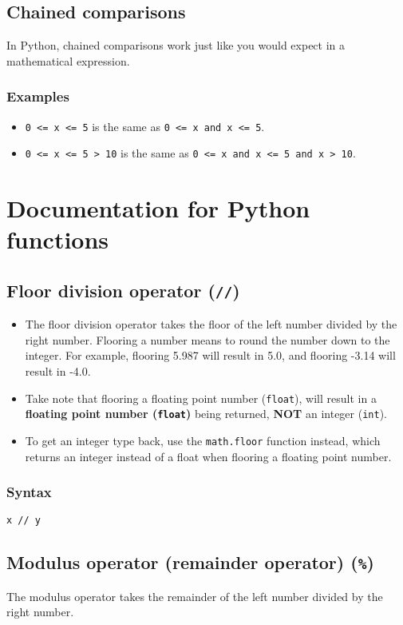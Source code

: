 \documentclass[11pt]{article}
\begin{document}
 \newpage
\subsection{Chained comparisons}
\label{sec:org6e1f575}
In Python, chained comparisons work just like you would expect in a mathematical expression.
\subsubsection{Examples}
\label{sec:org764e99a}
\begin{itemize}
\item \texttt{0 <= x <= 5} is the same as \texttt{0 <= x and x <= 5}.
\item \texttt{0 <= x <= 5 > 10} is the same as \texttt{0 <= x and x <= 5 and x > 10}.
\end{itemize}

 \newpage
\section{Documentation for Python functions}
\label{sec:org6902163}

\subsection{Floor division operator (\texttt{//})}
\label{sec:orga4ad882}
\begin{itemize}
\item The floor division operator takes the floor of the left number divided by the right number. Flooring a number means to round the number down to the integer. For example, flooring 5.987 will result in 5.0, and flooring -3.14 will result in -4.0.
\item Take note that flooring a floating point number (\texttt{float}), will result in a \textbf{floating point number (\texttt{float})} being returned, \textbf{NOT} an integer (\texttt{int}).
\item To get an integer type back, use the \texttt{math.floor} function instead, which returns an integer instead of a float when flooring a floating point number.
\end{itemize}
\subsubsection{Syntax}
\label{sec:org96f6313}
\texttt{x // y}
\subsection{Modulus operator (remainder operator) (\texttt{\%})}
\label{sec:org4841c2b}
The modulus operator takes the remainder of the left number divided by the right number.
\end{document}
